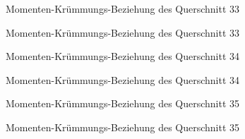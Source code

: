 \documentclass[
  11pt,
  letterpaper,
]{scrreprt}
\begin{document}
\begin{figure}[H]


\caption{\label{fig-qs_33}Momenten-Krümmungs-Beziehung des Querschnitt
33}

\end{figure}%

\begin{figure}[H]


\caption{\label{fig-m_chi_33}Momenten-Krümmungs-Beziehung des
Querschnitt 33}

\end{figure}%

\begin{figure}[H]


\caption{\label{fig-qs_34}Momenten-Krümmungs-Beziehung des Querschnitt
34}

\end{figure}%

\begin{figure}[H]


\caption{\label{fig-m_chi_34}Momenten-Krümmungs-Beziehung des
Querschnitt 34}

\end{figure}%

\begin{figure}[H]


\caption{\label{fig-qs_35}Momenten-Krümmungs-Beziehung des Querschnitt
35}

\end{figure}%

\begin{figure}[H]


\caption{\label{fig-m_chi_35}Momenten-Krümmungs-Beziehung des
Querschnitt 35}

\end{figure}%
\end{document}
